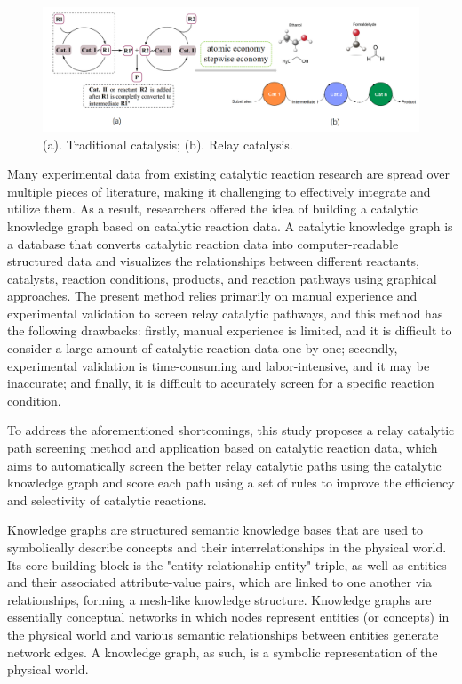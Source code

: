 \documentclass[%
 aip,
 jmp,%
 amsmath,amssymb,
 reprint,%
]{revtex4-2}
\begin{document}
\begin{figure}[htbp]
    \centering
    \includegraphics[width=1\textwidth]{figure/1.png}
    \caption{ (a). Traditional catalysis; (b). Relay catalysis. }
    \label{ Fig.1 }
\end{figure}

Many experimental data from existing catalytic reaction research are spread over multiple pieces of literature, making it challenging to effectively integrate and utilize them\cite{kizling1996review}. As a result, researchers offered the idea of building a catalytic knowledge graph\cite{segler2017modelling, gao2023revisiting} based on catalytic reaction data. A catalytic knowledge graph is a database that converts catalytic reaction data into computer-readable structured data and visualizes the relationships between different reactants, catalysts, reaction conditions, products, and reaction pathways\cite{burrows2002reaction} using graphical approaches. The present method relies primarily on manual experience and experimental validation to screen relay catalytic pathways\cite{luo2023relay, gao2015cobalt}, and this method has the following drawbacks: firstly, manual experience is limited, and it is difficult to consider a large amount of catalytic reaction data one by one; secondly, experimental validation is time-consuming and labor-intensive\cite{xu2014mechanism}, and it may be inaccurate; and finally, it is difficult to accurately screen for a specific reaction condition\cite{collins2014application}.

To address the aforementioned shortcomings, this study proposes a relay catalytic path screening method and application based on catalytic reaction data, which aims to automatically screen the better relay catalytic paths using the catalytic knowledge graph and score each path using a set of rules to improve the efficiency and selectivity of catalytic reactions.

Knowledge graphs\cite{ehrlinger2016towards} are structured semantic knowledge bases that are used to symbolically describe concepts and their interrelationships in the physical world. Its core building block is the "entity-relationship-entity" triple\cite{verborgh2016triple}, as well as entities and their associated attribute-value pairs, which are linked to one another via relationships, forming a mesh-like knowledge structure. Knowledge graphs are essentially conceptual networks in which nodes represent entities (or concepts) in the physical world and various semantic relationships between entities generate network edges. A knowledge graph, as such, is a symbolic representation\cite{zhang2021neural} of the physical world.
\end{document}
